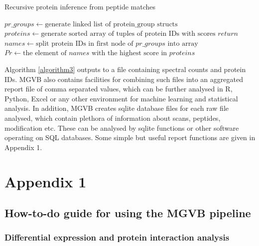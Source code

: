 \documentclass[sn-standardnature]{sn-jnl}%
\theoremstyle{thmstyleone}%
\theoremstyle{thmstyletwo}%
\theoremstyle{thmstylethree}%
\begin{document}
\begin{algorithm}
\caption{Recursive protein inference from peptide matches}\label{algorithm3}
\begin{algorithmic}[1]
\State $pr\_groups \gets \text {generate linked list of protein\_group structs}$ 
\State $proteins \gets \text {generate sorted array of tuples of protein IDs with scores}$ 
        \State $return$
    \EndIf
    \State $names \gets \text {split protein IDs in first node of $pr\_groups$ into array} $
    \State $Pr \gets \text {the element of $names$ with the highest score in $proteins$}$
    \State {}
    \State {}
    \State {}     
 \EndFunction
 \State {}
\end{algorithmic}
\end{algorithm}
\bigskip





Algorithm \ref{algorithm3} outputs to a file containing spectral counts and protein IDs. MGVB also contains facilities for combining such files into an aggregated report file of comma separated values, which can be further analysed in R, Python, Excel or any other environment for machine learning and statistical analysis. In addition, MGVB creates sqlite database files for each raw file analysed, which contain plethora of information about scans, peptides, modification etc. These can be analysed by sqlite functions or other software operating on SQL databases. Some simple but useful report functions are given in Appendix 1.

\section{Appendix 1}\label{sec4}

\subsection {How-to-do guide for using the MGVB pipeline} \label {subsect3}

\subsubsection{Differential expression and protein interaction analysis} \label {subsubsect1}
\end{document}
